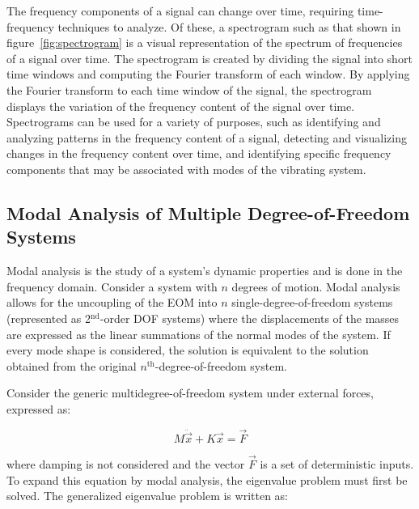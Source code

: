 \documentclass[12pt,letter]{article}
\begin{document}
The frequency components of a signal can change over time, requiring time-frequency techniques to analyze. Of these, a spectrogram such as that shown in figure~\ref{fig:spectrogram} is a visual representation of the spectrum of frequencies of a signal over time. The spectrogram is created by dividing the signal into short time windows and computing the Fourier transform of each window.  By applying the Fourier transform to each time window of the signal, the spectrogram displays the variation of the frequency content of the signal over time. Spectrograms can be used for a variety of purposes, such as identifying and analyzing patterns in the frequency content of a signal, detecting and visualizing changes in the frequency content over time, and identifying specific frequency components that may be associated with modes of the vibrating system.




\subsection{Modal Analysis of Multiple Degree-of-Freedom Systems}



Modal analysis is the study of a system's dynamic properties and is done in the frequency domain. Consider a system with $n$ degrees of motion. Modal analysis allows for the uncoupling of the EOM into $n$ single-degree-of-freedom systems (represented as 2$^{\text{nd}}$-order DOF systems) where the displacements of the masses are expressed as the linear summations of the normal modes of the system. If every mode shape is considered, the solution is equivalent to the solution obtained from the original $n^{\text{th}}$-degree-of-freedom system. 

Consider the generic multidegree-of-freedom system under external forces, expressed as:


\begin{equation}
	M \ddot{\vec{x}} + K\vec{x} = \vec{F}
\end{equation}


\noindent where damping is not considered and the vector $\vec{F}$ is a set of deterministic inputs. To expand this equation by modal analysis, the eigenvalue problem must first be solved. The generalized eigenvalue problem is written as: 
\end{document}
